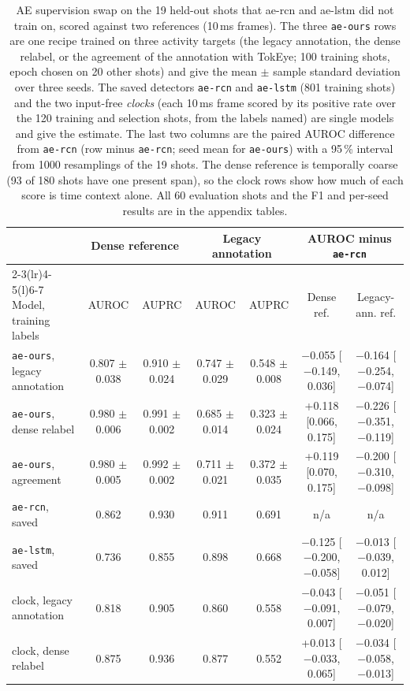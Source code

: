 \begin{table}[t]
\caption{AE supervision swap on the 19 held-out shots that ae-rcn and ae-lstm did not train on, scored against two references (10\,ms frames). The three \texttt{ae-ours} rows are one recipe trained on three activity targets (the legacy annotation, the dense relabel, or the agreement of the annotation with TokEye; 100 training shots, epoch chosen on 20 other shots) and give the mean $\pm$ sample standard deviation over three seeds. The saved detectors \texttt{ae-rcn} and \texttt{ae-lstm} (801 training shots) and the two input-free \emph{clocks} (each 10\,ms frame scored by its positive rate over the 120 training and selection shots, from the labels named) are single models and give the estimate. The last two columns are the paired AUROC difference from \texttt{ae-rcn} (row minus \texttt{ae-rcn}; seed mean for \texttt{ae-ours}) with a 95\,\% interval from 1000 resamplings of the 19 shots. The dense reference is temporally coarse (93 of 180 shots have one present span), so the clock rows show how much of each score is time context alone. All 60 evaluation shots and the F1 and per-seed results are in the appendix tables.}
\label{tab:ae_supervision_swap_main}
\centering\scriptsize
\setlength{\tabcolsep}{2.5pt}
\begin{tabular}{@{}l cc cc cc@{}}
\toprule
 & \multicolumn{2}{c}{Dense reference} & \multicolumn{2}{c}{Legacy annotation} & \multicolumn{2}{c}{AUROC minus \texttt{ae-rcn}} \\
\cmidrule(lr){2-3}\cmidrule(lr){4-5}\cmidrule(l){6-7}
Model, training labels & AUROC & AUPRC & AUROC & AUPRC & Dense ref. & Legacy-ann. ref. \\
\midrule
\texttt{ae-ours}, legacy annotation & 0.807 $\pm$ 0.038 & 0.910 $\pm$ 0.024 & 0.747 $\pm$ 0.029 & 0.548 $\pm$ 0.008 & $-$0.055 [$-$0.149, 0.036] & $-$0.164 [$-$0.254, $-$0.074] \\
\texttt{ae-ours}, dense relabel & 0.980 $\pm$ 0.006 & 0.991 $\pm$ 0.002 & 0.685 $\pm$ 0.014 & 0.323 $\pm$ 0.024 & +0.118 [0.066, 0.175] & $-$0.226 [$-$0.351, $-$0.119] \\
\texttt{ae-ours}, agreement & 0.980 $\pm$ 0.005 & 0.992 $\pm$ 0.002 & 0.711 $\pm$ 0.021 & 0.372 $\pm$ 0.035 & +0.119 [0.070, 0.175] & $-$0.200 [$-$0.310, $-$0.098] \\
\texttt{ae-rcn}, saved & 0.862 & 0.930 & 0.911 & 0.691 & n/a & n/a \\
\texttt{ae-lstm}, saved & 0.736 & 0.855 & 0.898 & 0.668 & $-$0.125 [$-$0.200, $-$0.058] & $-$0.013 [$-$0.039, 0.012] \\
clock, legacy annotation & 0.818 & 0.905 & 0.860 & 0.558 & $-$0.043 [$-$0.091, 0.007] & $-$0.051 [$-$0.079, $-$0.020] \\
clock, dense relabel & 0.875 & 0.936 & 0.877 & 0.552 & +0.013 [$-$0.033, 0.065] & $-$0.034 [$-$0.058, $-$0.013] \\
\bottomrule
\end{tabular}
\end{table}
